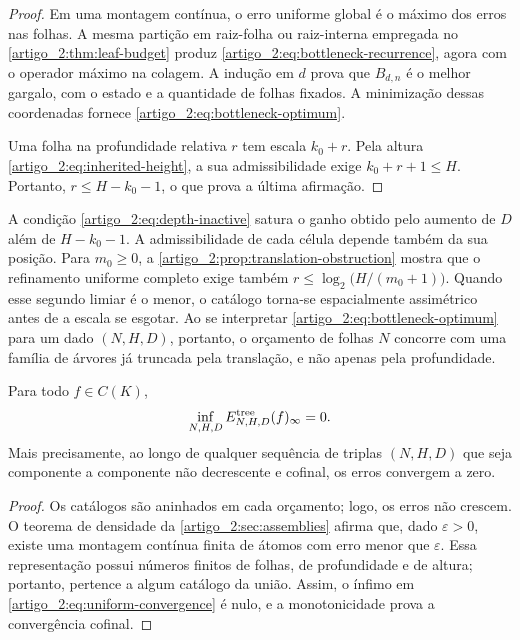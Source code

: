 \begin{proof}
Em uma montagem contínua, o erro uniforme global é o máximo dos erros nas
folhas. A mesma partição em raiz-folha ou raiz-interna empregada no
\cref{artigo_2:thm:leaf-budget} produz
\eqref{artigo_2:eq:bottleneck-recurrence}, agora com o operador máximo na colagem.
A indução em $d$ prova que $B_{d,n}$ é o melhor gargalo, com o estado e a
quantidade de folhas fixados. A minimização dessas coordenadas fornece
\eqref{artigo_2:eq:bottleneck-optimum}.

Uma folha na profundidade relativa $r$ tem escala $k_0+r$. Pela altura
\eqref{artigo_2:eq:inherited-height}, a sua admissibilidade exige
$k_0+r+1\le H$. Portanto, $r\le H-k_0-1$, o que prova a última afirmação.
\end{proof}

\begin{remark}\label{map:artigo_2:8.3}
\label{artigo_2:rem:depth-vs-translation}
A condição \eqref{artigo_2:eq:depth-inactive} satura o ganho obtido pelo aumento de $D$
além de $H-k_0-1$. A admissibilidade de cada célula depende também da sua
posição.
Para $m_0\ge0$, a \cref{artigo_2:prop:translation-obstruction} mostra que o refinamento
uniforme completo exige também
$r\le\log_2\bigl(H/(m_0+1)\bigr)$. Quando esse segundo limiar é o menor, o
catálogo torna-se espacialmente assimétrico antes de a escala se esgotar. Ao se interpretar
\eqref{artigo_2:eq:bottleneck-optimum} para um dado $(N,H,D)$, portanto, o orçamento de
folhas $N$ concorre com uma família de árvores já truncada pela
translação, e não apenas pela profundidade.
\end{remark}

\begin{corollary}\label{map:artigo_2:8.4}
\label{artigo_2:cor:uniform-convergence}
Para todo $f\in C(K)$,
\begin{equation}
 \inf_{N,H,D}E_{N,H,D}^{\rm tree}(f)_\infty=0.
 \label{artigo_2:eq:uniform-convergence}
\end{equation}
Mais precisamente, ao longo de qualquer sequência de triplas $(N,H,D)$ que
seja componente a componente não decrescente e cofinal, os erros convergem a
zero.
\end{corollary}

\begin{proof}
Os catálogos são aninhados em cada orçamento; logo, os erros não crescem. O
teorema de densidade da \cref{artigo_2:sec:assemblies} afirma que, dado $\varepsilon>0$,
existe uma montagem contínua finita de átomos com erro menor que
$\varepsilon$. Essa representação possui números finitos de folhas,
de profundidade e de altura; portanto, pertence a algum catálogo da união. Assim, o
ínfimo em \eqref{artigo_2:eq:uniform-convergence} é nulo, e a monotonicidade prova a
convergência cofinal.
\end{proof}

